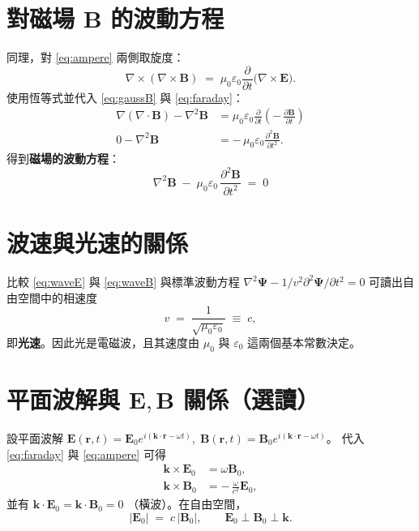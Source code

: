 \documentclass{article}
\def\dfrac#1#2{#1/#2}%
\begin{document}
\section*{對磁場 $\bm B$ 的波動方程}
同理，對 \eqref{eq:ampere} 兩側取旋度：
\begin{equation}
\nabla \times (\nabla \times \bm B) \;=\; \mu_0 \varepsilon_0 \frac{\partial}{\partial t}\bigl(\nabla \times \bm E\bigr).
\end{equation}
使用恆等式並代入 \eqref{eq:gaussB} 與 \eqref{eq:faraday}：
\begin{align}
\nabla(\nabla\cdot \bm B) - \nabla^2 \bm B &= \mu_0 \varepsilon_0 \frac{\partial}{\partial t}\!\left(-\,\frac{\partial \bm B}{\partial t}\right)\\
0 - \nabla^2 \bm B &= -\,\mu_0 \varepsilon_0 \frac{\partial^2 \bm B}{\partial t^2}.
\end{align}
得到\textbf{磁場的波動方程}：
\begin{equation}
\boxed{\;\nabla^2 \bm B \;-\; \mu_0 \varepsilon_0 \,\frac{\partial^2 \bm B}{\partial t^2} \;=\; 0\; } \label{eq:waveB}
\end{equation}

\section*{波速與光速的關係}
比較 \eqref{eq:waveE} 與 \eqref{eq:waveB} 與標準波動方程
\(
\nabla^2 \bm \Psi - \dfrac{1}{v^2}\dfrac{\partial^2 \bm \Psi}{\partial t^2}=0
\)
可讀出自由空間中的相速度
\begin{equation}
v \;=\; \frac{1}{\sqrt{\mu_0 \varepsilon_0}} \;\equiv\; c,
\end{equation}
即\textbf{光速}。因此光是電磁波，且其速度由 \(\mu_0\) 與 \(\varepsilon_0\) 這兩個基本常數決定。

\section*{平面波解與 $\bm E,\bm B$ 關係（選讀）}
設平面波解
\(
\bm E(\bm r,t)=\bm E_0 e^{i(\bm k\cdot \bm r-\omega t)},\;
\bm B(\bm r,t)=\bm B_0 e^{i(\bm k\cdot \bm r-\omega t)}
\)。
代入 \eqref{eq:faraday} 與 \eqref{eq:ampere} 可得
\begin{align}
\bm k \times \bm E_0 &= \omega \bm B_0,\\
\bm k \times \bm B_0 &= -\,\frac{\omega}{c^2}\bm E_0,
\end{align}
並有
\(
\bm k \cdot \bm E_0 = \bm k \cdot \bm B_0 = 0
\)
（橫波）。在自由空間，
\begin{equation}
|\bm E_0| \;=\; c\,|\bm B_0|, \qquad 
\bm E_0 \perp \bm B_0 \perp \bm k.
\end{equation}
\end{document}

